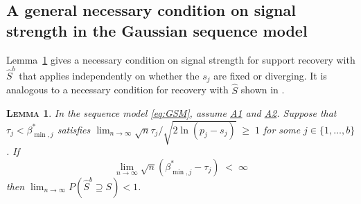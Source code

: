 \documentclass[bj,authoryear]{imsart}
\theoremstyle{plain}
\newtheorem{lem}[thm]{\textsc{Lemma}}
\begin{document}
\subsection{A general necessary condition on signal strength in the Gaussian sequence model}
Lemma~\ref{lem:gennecIIblockthresh} gives a necessary condition on signal strength for support recovery with $\hat{S}^b$ that applies independently on whether the $s_j$ are fixed or diverging. It is analogous to a necessary condition for recovery with $\hat{S}$ shown in \cite{abraham2023sharp}.
\begin{lem}\label{lem:gennecIIblockthresh} In the
sequence model \eqref{eq:GSM}, assume \hyperlink{lab:A1}{A1} and \hyperlink{lab:A2}{A2}.
Suppose that $\tau_j<\beta^*_{\min,j}$ satisfies $\lim_{n\to \infty} \sqrt{n}\tau_j/\sqrt{2\ln(p_j-s_j)}\;\geq\;1$ for some $j \in \{1,\ldots,b\}$. If \begin{equation}\label{cond:necIIallblockthresh2}
    \lim_{n\to \infty} \sqrt{n}(\beta_{\min,j}^*-\tau_j)\; <\; \infty
\end{equation}
then $\lim_{n \rightarrow \infty} P(\hat S^{b}\supseteq S  ) < 1$.
\end{lem}
\end{document}
